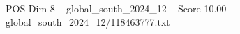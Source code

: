 \begin{textsample}{POS Dim 8 – global\_south\_2024\_12 – Score 10.00 – global\_south\_2024\_12/118463777.txt}
\end{textsample}
